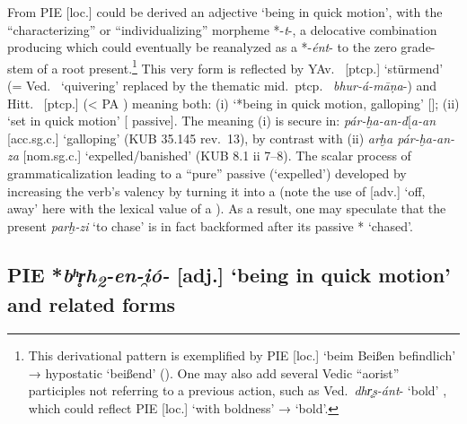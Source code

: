 \documentclass[output=paper,colorlinks,citecolor=brown]{langscibook}
\begin{document}
From PIE  [loc.] could be derived an adjective  ‘being in quick motion’, with the “characterizing” or “individualizing” morpheme *-\textit{t}-, a delocative combination producing  which could eventually be reanalyzed as a  *-\textit{ént}- to the zero grade-stem of a root present.\footnote{This derivational pattern is exemplified by PIE  [loc.] ‘beim Beißen befindlich’ → hypostatic  ‘beißend’ (\citealt[150--151, fn.\ 211]{Neri2017}). One may also add several Vedic “aorist” participles not referring to a previous action, such as Ved.\ \textit{dhr̥ṣ-ánt}-  ‘bold’ \citep[163]{Lowe2017}, which could reflect PIE  [loc.] ‘with boldness’ →  ‘bold’.} This very form is reflected by YAv.\  [ptcp.] ‘stürmend’ (= Ved.\  ‘quivering’ replaced by the thematic mid.\ ptcp.\    \textit{bhur-á-māṇa}-) and Hitt.\   [ptcp.] (< PA ) meaning both: (i) ‘*being in quick motion, galloping’ []; (ii) ‘set in quick motion’ [ passive]. The  meaning (i) is secure in: \textit{pár-ḫa-an-d}[\textit{a-an} [acc.sg.c.] ‘galloping’ (KUB 35.145 rev.\ 13), by contrast with (ii) \textit{arḫa pár-ḫa-an-za} [nom.sg.c.] ‘expelled/banished’ (KUB 8.1 ii 7–8). The scalar process of grammaticalization leading to a “pure”  passive  (‘expelled’) developed by increasing the verb’s valency by turning it into a  (note the use of  [adv.] ‘off, away’ here with the lexical value of a ). As a result, one may speculate that the  present \textit{parḫ-zi}  ‘to chase’ is in fact backformed after its passive  * ‘chased’.

\subsection{PIE *\textit{bʰr̥h\textsubscript{2}-en-i̯ó-} [adj.] ‘being in quick motion’ and related forms}
\label{sec:2.5}
\end{document}
